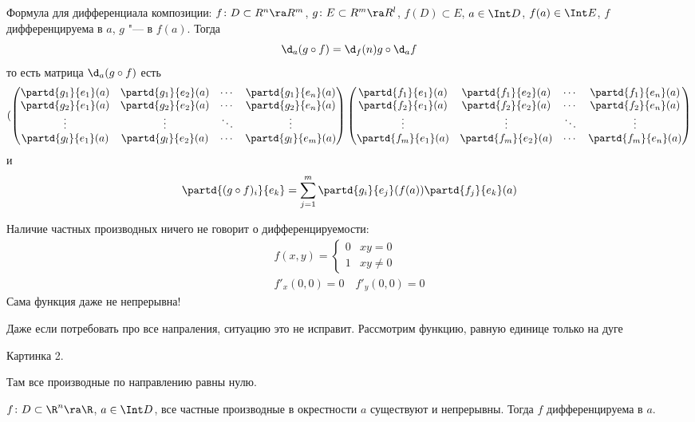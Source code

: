 \begin{conseq}
	Формула для дифференциала композиции:
	$f\colon D \subset R^n \ra R^m$, $g\colon E \subset R^m \ra R^l$, $f(D) \subset E$, $a \in \Int D$, $f(a) \in \Int E$,
	$f$ дифференцируема в $a$, $g$ "--- в $f(a)$.
	Тогда
	\[ \d_a(g \circ f) = \d_f(n) g \circ \d_a f \]
	то есть матрица $\d_a (g \circ f)$ есть
	\[(\begin{pmatrix}
		\partd{g_1}{e_1}(a) & \partd{g_1}{e_2}(a)
			&\cdots& \partd{g_1}{e_n}(a) \\
		\partd{g_2}{e_1}(a) & \partd{g_2}{e_2}(a)
			&\cdots& \partd{g_2}{e_n}(a) \\
		\vdots & \vdots & \ddots & \vdots \\
		\partd{g_l}{e_1}(a) & \partd{g_l}{e_2}(a)
			&\cdots& \partd{g_l}{e_m}(a) \\
	\end{pmatrix}\begin{pmatrix}
		\partd{f_1}{e_1}(a) & \partd{f_1}{e_2}(a)
			&\cdots& \partd{f_1}{e_n}(a) \\
		\partd{f_2}{e_1}(a) & \partd{f_2}{e_2}(a)
			&\cdots& \partd{f_2}{e_n}(a) \\
		\vdots & \vdots & \ddots & \vdots \\
		\partd{f_m}{e_1}(a) & \partd{f_m}{e_2}(a)
			&\cdots& \partd{f_m}{e_n}(a) \\
	\end{pmatrix}\]
	и
	\[ \partd{(g \circ f)_i}{e_k} = \sum_{j = 1}^m \partd{g_i}{e_j} (f(a)) \partd{f_j}{e_k} (a) \]
\end{conseq}

\begin{Rem}
	Наличие частных производных ничего не говорит о дифференцируемости:
	\begin{gather*}
		f(x, y) = \begin{cases} 0 & xy = 0 \\ 1 & xy \ne 0 \end{cases} \\
		f'_x(0, 0) = 0 \quad f'_y(0, 0) = 0
	\end{gather*}
	Сама функция даже не непрерывна!

	Даже если потребовать про все напраления, ситуацию это не исправит. Рассмотрим функцию, равную единице только на дуге

	Картинка 2.

	Там все производные по направлению равны нулю.
\end{Rem}

\begin{theorem}
	$f\colon D \subset \R^n \ra \R$, $a \in \Int D$, все частные производные в окрестности $a$ существуют и непрерывны.
	Тогда $f$ дифференцируема в $a$.
\end{theorem}